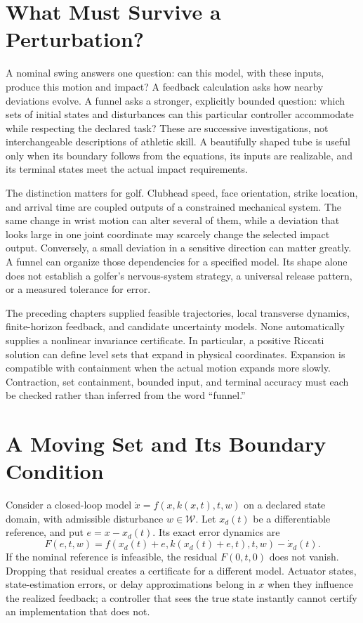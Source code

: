 \documentclass[12pt, openany]{book}
\theoremstyle{plain}
\begin{document}
\section{What Must Survive a Perturbation?}

A nominal swing answers one question: can this model, with these inputs, produce this motion and impact? A feedback calculation asks how nearby deviations evolve. A funnel asks a stronger, explicitly bounded question: which sets of initial states and disturbances can this particular controller accommodate while respecting the declared task? These are successive investigations, not interchangeable descriptions of athletic skill. A beautifully shaped tube is useful only when its boundary follows from the equations, its inputs are realizable, and its terminal states meet the actual impact requirements.

The distinction matters for golf. Clubhead speed, face orientation, strike location, and arrival time are coupled outputs of a constrained mechanical system. The same change in wrist motion can alter several of them, while a deviation that looks large in one joint coordinate may scarcely change the selected impact output. Conversely, a small deviation in a sensitive direction can matter greatly. A funnel can organize those dependencies for a specified model. Its shape alone does not establish a golfer's nervous-system strategy, a universal release pattern, or a measured tolerance for error.

The preceding chapters supplied feasible trajectories, local transverse dynamics, finite-horizon feedback, and candidate uncertainty models. None automatically supplies a nonlinear invariance certificate. In particular, a positive Riccati solution can define level sets that expand in physical coordinates. Expansion is compatible with containment when the actual motion expands more slowly. Contraction, set containment, bounded input, and terminal accuracy must each be checked rather than inferred from the word ``funnel.''

\section{A Moving Set and Its Boundary Condition}

Consider a closed-loop model $\dot x=f(x,k(x,t),t,w)$ on a declared state domain, with admissible disturbance $w\in\mathcal W$. Let $x_d(t)$ be a differentiable reference, and put $e=x-x_d(t)$. Its exact error dynamics are
\begin{equation}
 F(e,t,w)=f(x_d(t)+e,k(x_d(t)+e,t),t,w)-\dot x_d(t).
 \label{eq:funnel_exact_error}
\end{equation}
If the nominal reference is infeasible, the residual $F(0,t,0)$ does not vanish. Dropping that residual creates a certificate for a different model. Actuator states, state-estimation errors, or delay approximations belong in $x$ when they influence the realized feedback; a controller that sees the true state instantly cannot certify an implementation that does not.
\end{document}
